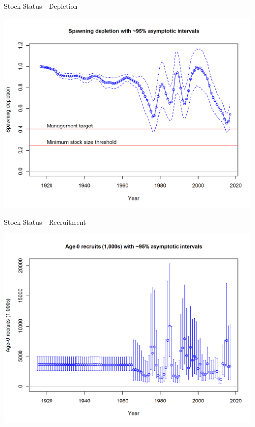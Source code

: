 \documentclass[ignorenonframetext,]{beamer}
\begin{document}
\begin{frame}{Stock Status - Depletion}

\centering
\includegraphics{r4ss/plots_mod1/ts9_Spawning_depletion_with_95_asymptotic_intervals_intervals.png}

\end{frame}

\begin{frame}{Stock Status - Recruitment}

\centering
\includegraphics{r4ss/plots_mod1/ts11_Age-0_recruits_(1000s)_with_95_asymptotic_intervals.png}

\end{frame}
\end{document}
